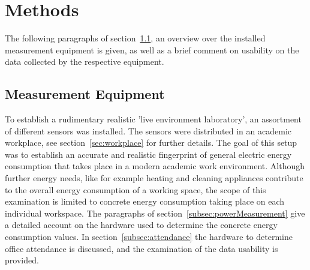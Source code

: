 \chapter{Methods}\label{chap:methods}
The following paragraphs of section~\ref{sec:measurement}, an overview over the installed measurement equipment is given, as well as a brief comment on usability on the data collected by the respective equipment.


\section{Measurement Equipment}\label{sec:measurement}
To establish a rudimentary realistic 'live environment laboratory', an assortment of different sensors was installed.
The sensors were distributed in an academic workplace, see section~\ref{sec:workplace} for further details.
The goal of this setup was to establish an accurate and realistic fingerprint of general electric energy consumption that takes place in a modern academic work environment.
Although further energy needs, like for example heating and cleaning appliances contribute to the overall energy consumption of a working space, the scope of this examination is limited to concrete energy consumption taking place on each individual workspace.
The paragraphs of section~\ref{subsec:powerMeasurement} give a detailed account on the hardware used to determine the concrete energy consumption values.
In section~\ref{subsec:attendance} the hardware to determine office attendance is discussed, and the examination of the data usability is provided.
